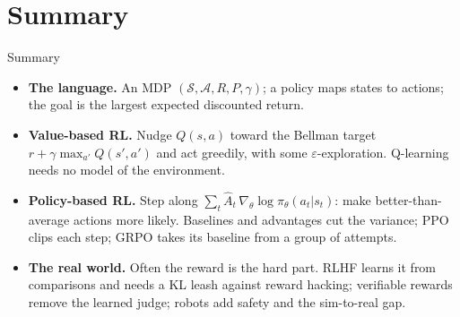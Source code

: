 \section{Summary}
\begin{frame}{Summary}
\begin{itemize}\itemsep0.6em
    \item \textbf{The language.} An MDP $(\mathcal{S}, \mathcal{A}, R, P, \gamma)$; a
          policy maps states to actions; the goal is the largest expected discounted
          return.
    \item \textbf{Value-based RL.} Nudge $Q(s,a)$ toward the Bellman target
          $r + \gamma \max_{a'} Q(s',a')$ and act greedily, with some
          $\varepsilon$-exploration. Q-learning needs no model of the environment.
    \item \textbf{Policy-based RL.} Step along
          $\sum_t \hat{A}_t\, \nabla_\theta \log \pi_\theta(a_t|s_t)$: make
          better-than-average actions more likely. Baselines and advantages cut the
          variance; PPO clips each step; GRPO takes its baseline from a group of
          attempts.
    \item \textbf{The real world.} Often the reward is the hard part. RLHF learns it
          from comparisons and needs a KL leash against reward hacking; verifiable
          rewards remove the learned judge; robots add safety and the sim-to-real
          gap.
\end{itemize}
\end{frame}

